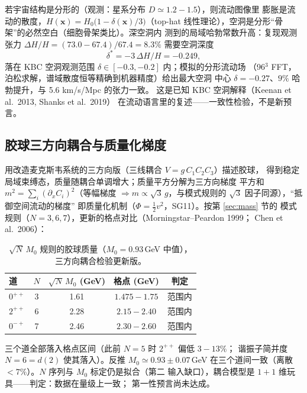 \documentclass[aps,prd,preprint,superscriptaddress,amsmath,amssymb]{revtex4-2}
\begin{document}
若宇宙结构是分形的（观测：星系分布 $D\simeq1.2{-}1.5$），则流动图像里
膨胀是流动的散度，$H(\bm{x})=H_0\big(1-\delta(\bm{x})/3\big)$（top-hat
线性理论），空洞是分形``骨架''的必然空白（细胞骨架类比）。深空洞内
测到的局域哈勃常数升高：复现观测张力
$\Delta H/H=(73.0-67.4)/67.4=8.3\%$ 需要空洞深度
\begin{equation}
\delta^* = -3\,\Delta H/H = -0.249 ,
\end{equation}
落在 KBC 空洞观测范围 $\delta\in[-0.3,-0.2]$ 内；模拟的分形流动场
（96$^3$ FFT，泊松求解，谱域散度恒等精确到机器精度）给出最大空洞
中心 $\delta=-0.27$、$9\%$ 哈勃提升，与 5.6 km/s/Mpc 的张力一致。
这是已知 KBC 空洞解释（Keenan et al.\ 2013, Shanks et al.\ 2019）
在流动语言里的复述——一致性检验，不是新预言。

\subsection{胶球三方向耦合与质量化梯度}

用改造麦克斯韦系统的三方向版（三线耦合 $V=g\,C_1C_2C_3$）描述胶球，
得到稳定局域束缚态，质量随耦合单调增大；质量平方分解为三方向梯度
平方和 $m^2=\sum_i(\partial_x C_i)^2$（等幅梯度 $\Rightarrow m\propto
\sqrt3\,g$，与模式规则的 $\sqrt3$ 因子同源），``抵御空间流动的梯度''
即质量化机制（$\Phi=\tfrac12 v^2$，SG11）。按第 \ref{sec:mass} 节的
模式规则（$N=3,6,7$），更新的格点对比（Morningstar--Peardon 1999；
Chen et al.\ 2006）：

\begin{table}[h]
\caption{$\sqrt{N}\,M_0$ 规则的胶球质量（$M_0=0.93$\,GeV 中值），
三方向耦合检验更新版。}
\label{tab:glueball2}
\begin{ruledtabular}
\begin{tabular}{lcccc}
道 & $N$ & $\sqrt{N}\,M_0$ (GeV) & 格点 (GeV) & 判定 \\
\hline
$0^{++}$ & 3 & 1.61 & $1.475{-}1.75$ & 范围内 \\
$2^{++}$ & 6 & 2.28 & $2.15{-}2.40$ & 范围内 \\
$0^{-+}$ & 7 & 2.46 & $2.30{-}2.60$ & 范围内 \\
\end{tabular}
\end{ruledtabular}
\end{table}

三个道全部落入格点区间（此前 $N=5$ 时 $2^{++}$ 偏低 $3{-}13\%$；
谐振子简并度 $N=6=d(2)$ 使其落入）。反推 $M_0\simeq0.93\pm0.07$\,GeV
在三个道间一致（离散 $<7\%$）。$N$ 序列与 $M_0$ 标定仍是拟合（第二
输入缺口），耦合模型是 $1{+}1$ 维玩具——判定：数据在量级上一致；
第一性预言尚未达成。
\end{document}
